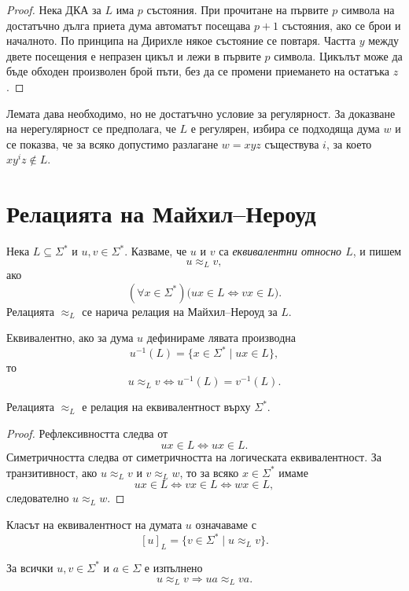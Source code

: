 \begin{proof}
Нека ДКА за $L$ има $p$ състояния. При прочитане на първите $p$ символа на достатъчно дълга приета дума автоматът посещава $p+1$ състояния, ако се брои и началното. По принципа на Дирихле някое състояние се повтаря. Частта $y$ между двете посещения е непразен цикъл и лежи в първите $p$ символа. Цикълът може да бъде обходен произволен брой пъти, без да се промени приемането на остатъка $z$.
\end{proof}

Лемата дава необходимо, но не достатъчно условие за регулярност. За доказване на нерегулярност се предполага, че $L$ е регулярен, избира се подходяща дума $w$ и се показва, че за всяко допустимо разлагане $w=xyz$ съществува $i$, за което $xy^iz\notin L$.

\section{Релацията на Майхил--Нероуд}\label{s:4.5}

\begin{defn}
Нека $L\subseteq\Sigma^*$ и $u,v\in\Sigma^*$. Казваме, че $u$ и $v$ са \emph{еквивалентни относно $L$}, и пишем
\[
u\approx_L v,
\]
ако
\[
(\forall x\in\Sigma^*)\bigl(ux\in L\Longleftrightarrow vx\in L\bigr).
\]
Релацията $\approx_L$ се нарича релация на Майхил--Нероуд за $L$.
\end{defn}

Еквивалентно, ако за дума $u$ дефинираме лявата производна
\[
u^{-1}(L)=\{x\in\Sigma^*\mid ux\in L\},
\]
то
\[
u\approx_L v
\Longleftrightarrow
u^{-1}(L)=v^{-1}(L).
\]

\begin{prop}
Релацията $\approx_L$ е релация на еквивалентност върху $\Sigma^*$.
\end{prop}

\begin{proof}
Рефлексивността следва от
\[
ux\in L\Longleftrightarrow ux\in L.
\]
Симетричността следва от симетричността на логическата еквивалентност. За транзитивност, ако $u\approx_L v$ и $v\approx_L w$, то за всяко $x\in\Sigma^*$ имаме
\[
ux\in L\Longleftrightarrow vx\in L
\Longleftrightarrow wx\in L,
\]
следователно $u\approx_L w$.
\end{proof}

Класът на еквивалентност на думата $u$ означаваме с
\[
[u]_L=\{v\in\Sigma^*\mid u\approx_L v\}.
\]

\begin{prop}
За всички $u,v\in\Sigma^*$ и $a\in\Sigma$ е изпълнено
\[
u\approx_L v\Longrightarrow ua\approx_L va.
\]
\end{prop}

